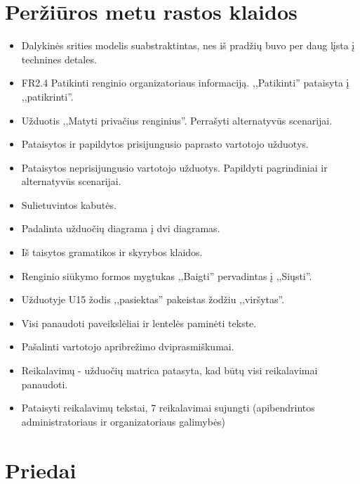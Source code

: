 \documentclass{VUMIFPSkursinis}
\begin{document}
    \section{Peržiūros metu rastos klaidos}
		\begin{itemize}
			\item Dalykinės srities modelis suabstraktintas, nes iš pradžių buvo per daug lįsta į technines detales.
			\item FR2.4 Patikinti renginio organizatoriaus informaciją. ,,Patikinti'' pataisyta į ,,patikrinti''.
			\item Užduotis ,,Matyti privačius renginius''. Perrašyti alternatyvūs scenarijai.
			\item Pataisytos ir papildytos prisijungusio paprasto vartotojo užduotys.
			\item Pataisytos neprisijungusio vartotojo užduotys. Papildyti pagrindiniai ir alternatyvūs scenarijai.
			\item Sulietuvintos kabutės.
			\item Padalinta užduočių diagrama į dvi diagramas.
			\item Iš	taisytos gramatikos ir skyrybos klaidos.
			\item Renginio siūkymo formos mygtukas ,,Baigti'' pervadintas į ,,Siųsti''.
			\item Užduotyje U15 žodis ,,pasiektas'' pakeistas žodžiu ,,viršytas''.
			\item Visi panaudoti paveikslėliai ir lentelės paminėti tekste.
			\item Pašalinti vartotojo apribrežimo dviprasmiškumai.
			\item Reikalavimų - užduočių matrica patasyta, kad būtų visi reikalavimai panaudoti.
			\item Pataisyti reikalavimų tekstai, 7 reikalavimai sujungti (apibendrintos administratoriaus ir organizatoriaus galimybės)
		\end{itemize}
		
    \section{Priedai}\label{priedai}
\end{document}
